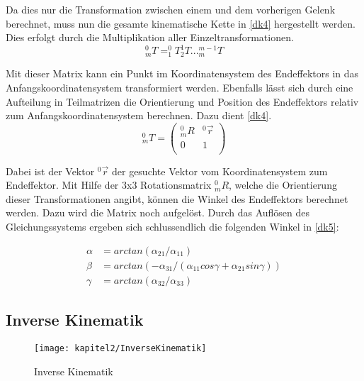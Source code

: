 Da dies nur die Transformation zwischen einem und dem vorherigen Gelenk berechnet, muss nun die gesamte kinematische Kette in \autoref{dk4} hergestellt werden. Dies erfolgt durch die Multiplikation aller Einzeltransformationen.
\begin{equation}
  _{m}^{0}T = ^{0}_{1}T^{1}_{2}T...^{m-1}_{m}T
\label{dk4}
\end{equation}

Mit dieser Matrix kann ein Punkt im Koordinatensystem des Endeffektors in das Anfangskoordinatensystem transformiert werden. Ebenfalls lässt sich durch eine Aufteilung in Teilmatrizen die Orientierung und Position des Endeffektors relativ zum Anfangskoordinatensystem berechnen. Dazu dient \autoref{dk4}.
\begin{equation}
  _{m}^{0}T = \begin{pmatrix}
    _{m}^{0}R & ^{0}\vec{r}\\
    0 & 1\\
  \end{pmatrix}
\label{dk4}
\end{equation}

Dabei ist der Vektor $^{0}\vec{r}$ der gesuchte Vektor vom Koordinatensystem zum Endeffektor. Mit Hilfe der 3x3 Rotationsmatrix $_{m}^{0}R$, welche die Orientierung dieser Transformationen angibt, können die Winkel des Endeffektors berechnet werden. Dazu wird die Matrix noch aufgelöst. Durch das Auflösen des Gleichungssystems ergeben sich schlussendlich die folgenden Winkel in \autoref{dk5}:

\begin{equation}
  \begin{aligned}
    \alpha & = arctan(\alpha_{21} / \alpha_{11}) \\
    \beta & = arctan(-\alpha_{31} / (\alpha_{11} cos \gamma + \alpha_{21} sin \gamma)) \\
    \gamma & = arctan(\alpha_{32} / \alpha_{33})
  \end{aligned}
\label{dk5}
\end{equation}

\subsection{Inverse Kinematik}

\begin{figure}[b!]
  \centering
  \texttt{[image: kapitel2/InverseKinematik]}
  \caption{Inverse Kinematik}
  \label{Kap2:inversekinematik}
\end{figure}

